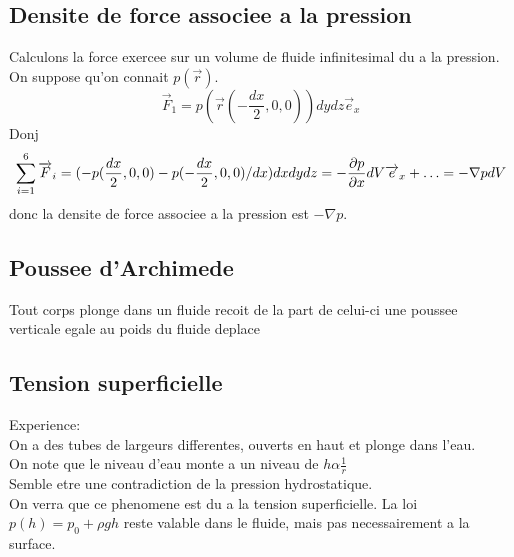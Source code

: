 \documentclass[../main.tex]{subfiles}
\begin{document}
\subsection{Densite de force associee a la pression}
Calculons la force exercee sur un volume de fluide infinitesimal du a la pression.\\
On suppose qu'on connait $p( \vec{r}) $.
\[ 
	\vec{F}_1=p( \vec{r}( - \frac{dx}{2},0,0) )  dy dz \vec{e}_x
\]
Donj
\[ 
	\sum_{i=1}^{ 6}\overrightarrow{F}_i = ( -p( \frac{dx}{2},0,0) - p( - \frac{dx}{2},0,0) / dx ) dx dy dz = - \frac{\partial p}{\partial x} dV \overrightarrow{e}_x + \ldots = - \nabla p dV
\]
donc la densite de force associee a la pression est $-\nabla p$.
\subsection{Poussee d'Archimede}
Tout corps plonge dans un fluide recoit de la part de celui-ci une poussee verticale egale au poids du fluide deplace
\subsection{Tension superficielle}
Experience:\\
On a des tubes de largeurs differentes, ouverts en haut et plonge dans l'eau.\\
On note que le niveau d'eau monte a un niveau de $h \alpha \frac{1}{r}$ \\
Semble etre une contradiction de la pression hydrostatique.\\
On verra que ce phenomene est du a la tension superficielle.
La loi $p( h) = p_0 + \rho g h$ reste valable dans le fluide, mais pas necessairement a la surface.
\end{document}

